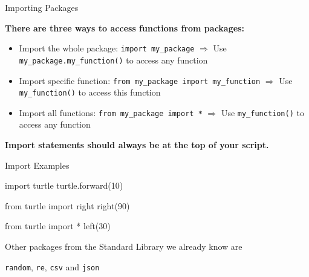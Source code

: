 \begin{frame}[fragile]{Importing Packages}

    \textbf{There are three ways to access functions from packages:}

    \begin{itemize}

        \item Import the whole package: \texttt{import my\_package} 
              \newline $\Rightarrow$ Use \texttt{my\_package.my\_function()} to access any function

        \item Import specific function: \texttt{from my\_package import my\_function} 
              \newline $\Rightarrow$ Use \texttt{my\_function()} to access this function


        \item Import all functions: \texttt{from my\_package import *} 
              \newline $\Rightarrow$ Use \texttt{my\_function()} to access any function

    \end{itemize}

    \textbf{Import statements should always be at the top of your script.} 


\end{frame}


\begin{frame}[fragile]{Import Examples}

    \begin{pythoncode}

import turtle
turtle.forward(10)

from turtle import right
right(90)

from turtle import *
left(30)

    \end{pythoncode}

    Other packages from the Standard Library we already know are 

    \texttt{random}, \texttt{re}, \texttt{csv} and \texttt{json}


\end{frame}


